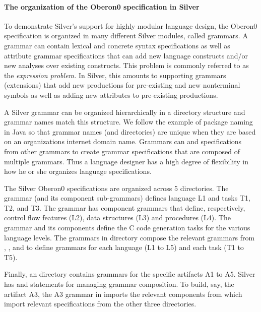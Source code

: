 \paragraph{The organization of the Oberon0 specification in Silver}

To demonstrate Silver's support for highly modular language design, the
Oberon0 specification is organized in many different Silver modules,
called grammars.
%
A grammar can contain lexical and concrete syntax specifications as
well as attribute grammar specifications
%
that can add new language constructs and/or new analyses over existing
constructs.  This problem is commonly referred to as the
\emph{expression problem.}  In Silver, this amounts to supporting
grammars (extensions) that add new productions for pre-existing and
new nonterminal symbols as well as adding new attributes to
pre-existing productions.


A Silver grammar can be organized hierarchically in a directory
structure and grammar names match this structure.  We follow the
example of package naming in Java so that grammar names (and
directories) are unique when they are based on an organizations
internet domain name.
%
%
Grammars can  and  specifications from other
grammars to create grammar specifications that are composed of
multiple grammars.
%
Thus a language designer has a high degree of flexibility in how he or
she organizes language specifications.

The Silver Oberon0 specifications are organized across 5
directories.  The  grammar (and its component sub-grammars)
defines language L1 and tasks T1, T2, and T3.  The 
grammar has component grammars that define, respectively, control flow
features (L2), data structures (L3) and procedures (L4).
The  grammar and its components define the C code
generation tasks for the various language levels.
%
The grammars in  directory compose the relevant
grammars from , , and  to
define grammars for each language (L1 to L5) and each task (T1 to T5).
%

Finally, an  directory contains grammars for the
specific artifacts A1 to A5.  Silver has 
and  statements for managing grammar composition.  To
build, say, the artifact A3, the A3 grammar in 
imports the relevant components from  which import
relevant specifications from the other three directories.

